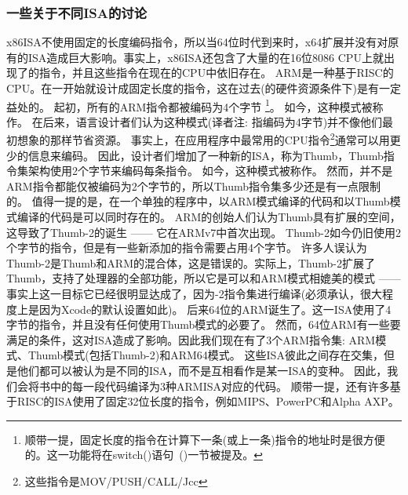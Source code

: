 %
%
%

\subsubsection{一些关于不同\ac{ISA}的讨论}
x86\ac{ISA}不使用固定的长度编码指令，所以当64位时代到来时，x64扩展并没有对原有的\ac{ISA}造成巨大影响。事实上，x86\ac{ISA}还包含了大量的在16位8086 CPU上就出现了的指令，并且这些指令在现在的CPU中依旧存在。
ARM是一种基于\ac{RISC}的\ac{CPU}。在一开始就设计成固定长度的指令，这在过去(的硬件资源条件下)是有一定益处的。
起初，所有的ARM指令都被编码为4个字节%
\footnote{
顺带一提，固定长度的指令在计算下一条(或上一条)指令的地址时是很方便的。这一功能将在switch()语句~()一节被提及。
}。
如今，这种模式被称作。
在后来，语言设计者们认为这种模式(译者注: 指编码为4字节)并不像他们最初想象的那样节省资源。
事实上，在应用程序中最常用的\ac{CPU}指令\footnote{这些指令是MOV/PUSH/CALL/Jcc}通常可以用更少的信息来编码。
因此，设计者们增加了一种新的\ac{ISA}，称为Thumb，Thumb指令集架构使用2个字节来编码每条指令。
如今，这种模式被称作。
然而，并不是ARM指令都能仅被编码为2个字节的，所以Thumb指令集多少还是有一点限制的。
值得一提的是，在一个单独的程序中，以ARM模式编译的代码和以Thumb模式编译的代码是可以同时存在的。
ARM的创始人们认为Thumb具有扩展的空间，这导致了Thumb-2的诞生 —— 它在ARMv7中首次出现。
Thumb-2如今仍旧使用2个字节的指令，但是有一些新添加的指令需要占用4个字节。
许多人误认为Thumb-2是Thumb和ARM的混合体，这是错误的。实际上，Thumb-2扩展了Thumb，支持了处理器的全部功能，所以它是可以和ARM模式相媲美的模式 —— 事实上这一目标它已经很明显达成了，因为-2指令集进行编译(必须承认，很大程度上是因为Xcode的默认设置如此)。
后来64位的ARM诞生了。这一\ac{ISA}使用了4字节的指令，并且没有任何使用Thumb模式的必要了。
然而，64位ARM有一些要满足的条件，这对\ac{ISA}造成了影响。因此我们现在有了3个ARM指令集: ARM模式、Thumb模式(包括Thumb-2)和ARM64模式。
这些\ac{ISA}彼此之间存在交集，但是他们都可以被认为是不同的\ac{ISA}，而不是互相看作是某一\ac{ISA}的变种。
因此，我们会将书中的每一段代码编译为3种ARM\ac{ISA}对应的代码。
%
%
%
顺带一提，还有许多基于\ac{RISC}的\ac{ISA}使用了固定32位长度的指令，例如MIPS、PowerPC和Alpha AXP。
